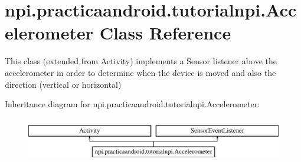 \hypertarget{classnpi_1_1practicaandroid_1_1tutorialnpi_1_1_accelerometer}{\section{npi.\-practicaandroid.\-tutorialnpi.\-Accelerometer Class Reference}
\label{classnpi_1_1practicaandroid_1_1tutorialnpi_1_1_accelerometer}
}


This class (extended from Activity) implements a Sensor listener above the accelerometer in order to determine when the device is moved and also the direction (vertical or horizontal)  


Inheritance diagram for npi.\-practicaandroid.\-tutorialnpi.\-Accelerometer\-:\begin{figure}[H]
\begin{center}
\leavevmode
\includegraphics[height=2.000000cm]{classnpi_1_1practicaandroid_1_1tutorialnpi_1_1_accelerometer}
\end{center}
\end{figure}
